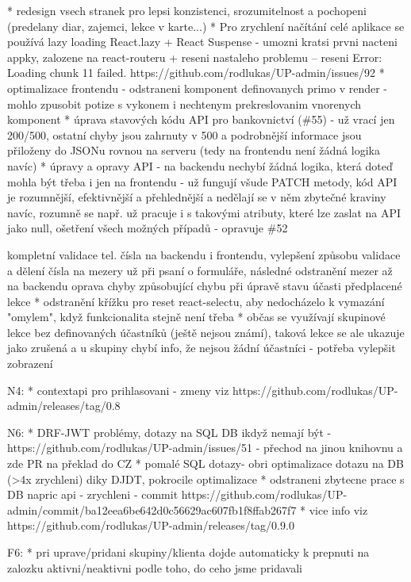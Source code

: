 * redesign vsech stranek pro lepsi konzistenci, srozumitelnost a pochopeni (predelany diar, zajemci, lekce v karte...)
* Pro zrychlení načítání celé aplikace se používá lazy loading React.lazy + React Suspense - umozni kratsi prvni nacteni appky, zalozene na react-routeru + reseni nastaleho problemu -- reseni Error: Loading chunk 11 failed. https://github.com/rodlukas/UP-admin/issues/92
* optimalizace frontendu - odstraneni komponent definovanych primo v render - mohlo zpusobit potize s vykonem i nechtenym prekreslovanim vnorenych komponent
* úprava stavových kódu API pro bankovnictví (\#55) - už vrací jen 200/500, ostatní chyby jsou zahrnuty v 500 a podrobnější informace jsou přiloženy do JSONu rovnou na serveru (tedy na frontendu není žádná logika navíc)
* úpravy a opravy API - na backendu nechybí žádná logika, která doteď mohla být třeba i jen na frontendu - už fungují všude PATCH metody, kód API je rozumnější, efektivnější a přehlednější a nedělají se v něm zbytečné kraviny navíc, rozumně se např. už pracuje i s takovými atributy, které lze zaslat na API jako null, ošetření všech možných případů - opravuje \#52

    kompletní validace tel. čísla na backendu i frontendu, vylepšení způsobu validace a dělení čísla na mezery už při psaní o formuláře, následné odstranění mezer až na backendu
    oprava chyby způsobující chybu při úpravě stavu účasti předplacené lekce
* odstranění křížku pro reset react-selectu, aby nedocházelo k vymazání "omylem", když funkcionalita stejně není třeba
* občas se využívají skupinové lekce bez definovaných účastníků (ještě nejsou známí), taková lekce se ale ukazuje jako zrušená a u skupiny chybí info, že nejsou žádní účastníci - potřeba vylepšit zobrazení


N4:
* contextapi pro prihlasovani - zmeny viz https://github.com/rodlukas/UP-admin/releases/tag/0.8

N6:
* DRF-JWT problémy, dotazy na SQL DB ikdyž nemají být - https://github.com/rodlukas/UP-admin/issues/51 - přechod na jinou knihovnu a zde PR na překlad do CZ
* pomalé SQL dotazy- obri optimalizace dotazu na DB (>4x zrychleni) diky DJDT, pokrocile optimalizace
* odstraneni zbytecne prace s DB napric api - zrychleni - commit https://github.com/rodlukas/UP-admin/commit/ba12eea6be642d0c56629ac607fb1f8ffab267f7
* vice info viz https://github.com/rodlukas/UP-admin/releases/tag/0.9.0

F6: 
* pri uprave/pridani skupiny/klienta dojde automaticky k prepnuti na zalozku aktivni/neaktivni podle toho, do ceho jsme pridavali

